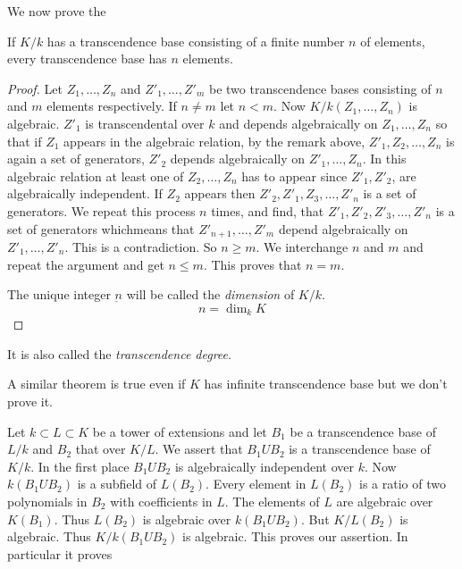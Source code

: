  We now  prove the 

\begin{thm}\label{c1:thm9}%
If $ K/k $  has a transcendence base consisting  of a finite
  number $n$  of elements, every transcendence base has $ n $
  elements. 
\end{thm}   

\begin{proof}
 Let $ Z_1 , \ldots , Z_n $  and $ Z'_1 , \ldots , Z'_m $  be two
 transcendence  bases consisting  of $n$  and $m$ elements
 respectively. If $  n \neq m $  let  $ n < m $. Now $ K / k ( Z_1 ,
 \ldots , Z_n ) $ is algebraic. $Z'_1$  is transcendental over $k$
 and depends algebraically on $ Z_1 , \ldots , Z_n $  so  that if
 $Z_1$  appears in  the algebraic relation, by the remark above, $
 Z'_1, Z_2 , \ldots , Z_n $ is again a set of generators, $ Z'_2 $
 depends algebraically on $ Z'_1 , \ldots , Z_n $. In this  algebraic
 relation at least one  of $ Z_2 , \ldots , Z_n $ has to appear since
 $ Z'_1, Z'_2 $, are algebraically independent. If $Z_2 $ appears then
 $ Z'_2, Z'_1, Z_3 , \ldots , Z'_n $  is a set of generators. We
 repeat this process $n$  times, and find, that $ Z'_1, Z'_2, Z'_3,
 \ldots , Z'_n $ is  a set of generators  which\pageoriginale means
 that $ Z'_{n + 1  } , \ldots , Z'_m $  depend algebraically on $ Z'_1
 , \ldots , Z'_n  $. This is a contradiction. So $n \geq m$. We
 interchange $n$  and  $m$  and repeat the argument and get $n \leq
 m$. This proves that $n  = m$.  
 
 The unique  integer $\underbar{n}$ will be called the
 \textit{dimension} of  $K/k$.   
$$
n = \dim_k K 
$$
\end{proof} 

It is also called the  \textit{transcendence  degree}.

A similar  theorem is true even if $K$  has infinite  transcendence
base but we don't prove it. 
 
 Let $ k \subset L \subset K $  be a  tower of extensions and let   $
 B_1 $  be  a transcendence base of $ L / k $ and $ B_2 $  that over $
 K / L $. We assert that $ B_1  U B_2 $  is a transcendence base of $
 K/k$. In the first place $ B_1 U B_2 $  is algebraically independent
 over $k$. Now $k ( B_1 U B_2 )$  is a subfield of $ L(B_2)$. Every
 element in $ L(B_2) $ is a ratio of two polynomials in $B_2$  with
 coefficients in $L$. The elements of $L$  are algebraic over $K
 (B_1)$. Thus $L (B_2)$ is  algebraic over $k ( B_1 U B_2 )$. But $ K
 /L (B_2) $  is algebraic. Thus $ K/k (B_1 U B_2 ) $  is
 algebraic. This proves our  assertion. In particular it proves  

